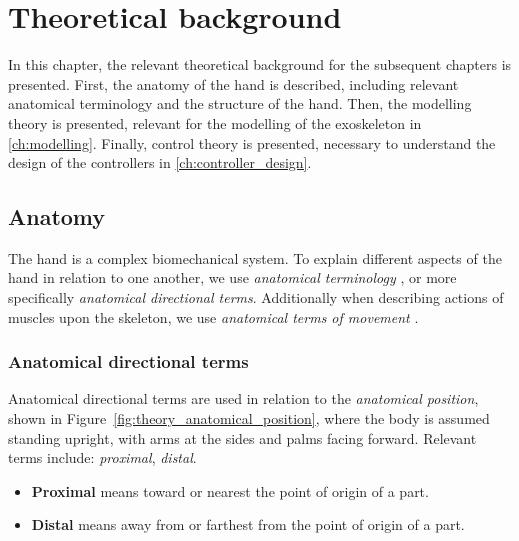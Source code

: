 
\chapter{Theoretical background}%
\label{ch:theory}

In this chapter, the relevant theoretical background for the subsequent chapters is presented. First, the anatomy of the hand is described, including relevant anatomical terminology and the structure of the hand. Then, the modelling theory is presented, relevant for the modelling of the exoskeleton in \cref{ch:modelling}. Finally, control theory is presented, necessary to understand the design of the controllers in \cref{ch:controller_design}.

\section{Anatomy}%
\label{sec:theory_anatomy}

The hand is a complex biomechanical system. To explain different aspects of the hand in relation to one another, we use \textit{anatomical terminology} \parencite{AnatomicalTerminologySEER}, or more specifically \textit{anatomical directional terms}. Additionally when describing actions of muscles upon the skeleton, we use \textit{anatomical terms of movement} \parencite{TermsOfMovementTeachMeAnatomy}.

\subsection{Anatomical directional terms}%
\label{subsec:theory_anatomical_directional_terms}

Anatomical directional terms are used in relation to the \textit{anatomical position}, shown in Figure~\ref{fig:theory_anatomical_position}, where the body is assumed standing upright, with arms at the sides and palms facing forward. Relevant terms include: \textit{proximal}, \textit{distal}.

\begin{itemize}
    \item \textbf{Proximal} means toward or nearest the point of origin of a part.
    \item \textbf{Distal} means away from or farthest from the point of origin of a part.
\end{itemize}

